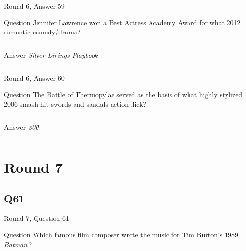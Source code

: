 \documentclass[11pt]{beamer}
\begin{document}
\begin{frame}[t]{Round 6, Answer 59}
\vspace{2em}
\begin{block}{Question}
Jennifer Lawrence won a Best Actress Academy Award for what 2012 romantic comedy/drama?
\end{block}
\pause{}
\begin{columns}[T,totalwidth=\linewidth]
\begin{column}{0.35\linewidth}
\begin{block}{Answer}
\emph{Silver Linings Playbook}
\end{block}
\end{column}
\begin{column}{0.6\linewidth}
\begin{center}
\texttt{[image: \{Images/silverlinings]}.jpg}
\end{center}
\end{column}
\end{columns}
\end{frame}
    

\begin{frame}[t]{Round 6, Answer 60}
\vspace{2em}
\begin{block}{Question}
The Battle of Thermopylae served as the basis of what highly stylized 2006 smash hit swords-and-sandals action flick?
\end{block}
\pause{}
\begin{columns}[T,totalwidth=\linewidth]
\begin{column}{0.35\linewidth}
\begin{block}{Answer}
\emph{300}
\end{block}
\end{column}
\begin{column}{0.6\linewidth}
\begin{center}
\texttt{[image: \{Images/300movie]}.jpg}
\end{center}
\end{column}
\end{columns}
\end{frame}
    

\section{Round 7}
    

\subsection*{Q61}
\begin{frame}[t]{Round 7, Question 61}
\vspace{2em}
\begin{block}{Question}
Which famous film composer wrote the music for Tim Burton's 1989 \emph{Batman}\,?
\end{block}
\end{frame}
    
\end{document}
